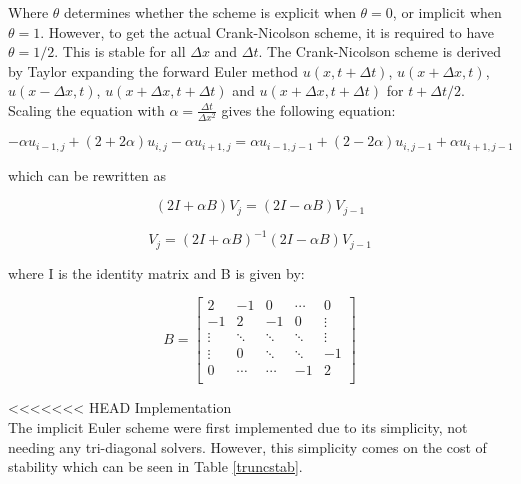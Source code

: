 \documentclass[10pt,a4paper]{article}
\begin{document}
\noindent Where $\theta$ determines whether the scheme is explicit when $\theta = 0$, or implicit when $\theta = 1$. However, to get the actual Crank-Nicolson scheme, it is required to have $\theta = 1/2$. This is stable for all $\Delta x$ and $\Delta t$. The Crank-Nicolson scheme is derived by Taylor expanding the forward Euler method $u(x,t + \Delta t)$, $u(x + \Delta x,t)$, $u(x - \Delta x,t)$, $u(x + \Delta x, t + \Delta t)$ and $u(x + \Delta x, t + \Delta t)$ for $t + \Delta t/2$.\\

\noindent Scaling the equation with $\alpha = \frac{\Delta t}{\Delta x^2}$ gives the following equation:

\begin{equation}
-\alpha u_{i-1,j} + (2 + 2\alpha)u_{i,j} -\alpha u_{i+1,j} = \alpha u_{i-1,j-1} + (2-2\alpha)u_{i,j-1} + \alpha u_{i+1,j-1}
\end{equation}

\noindent which can be rewritten as

\begin{equation}
(2I + \alpha B)V_j = (2I - \alpha B)V_{j-1}
\end{equation}

\begin{equation}
V_j = (2I + \alpha B)^{-1}(2I - \alpha B)V_{j-1}
\end{equation}

\noindent where I is the identity matrix and B is given by:

\begin{equation}
B = \begin{bmatrix}
2 & -1 & 0 & \cdots &0\\
-1 & 2 & -1 & 0 & \vdots\\
\vdots & \ddots & \ddots & \ddots & \vdots\\
\vdots & 0 & \ddots & \ddots & -1\\
0 & \cdots & \cdots & -1 & 2\\
\end{bmatrix}
\end{equation}

<<<<<<< HEAD
\noindent Implementation\\

\noindent The implicit Euler scheme were first implemented due to its simplicity, not needing any tri-diagonal solvers. However, this simplicity comes on the cost of stability which can be seen in Table \ref{truncstab}. 
\end{document}
